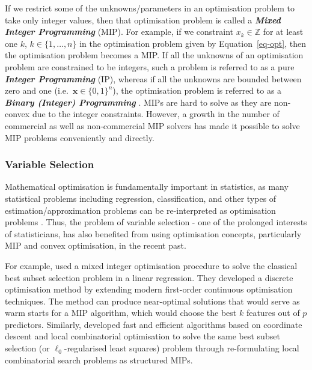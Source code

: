 \documentclass[11pt,a4paper,]{article}
\begin{document}
If we restrict some of the unknowns/parameters in an optimisation
problem to take only integer values, then that optimisation problem is
called a \textbf{\emph{Mixed Integer Programming}} (MIP). For example,
if we constraint \(x_{k} \in \mathbb{Z}\) for at least one \(k\),
\(k \in \{1, \dots, n\}\) in the optimisation problem given by
Equation~\ref{eq-opt}, then the optimisation problem becomes a MIP. If
all the unknowns of an optimisation problem are constrained to be
integers, such a problem is referred to as a pure \textbf{\emph{Integer
Programming}} (IP), whereas if all the unknowns are bounded between zero
and one (i.e.~\(\bm{x} \in \{ 0, 1 \}^{n}\)), the optimisation problem
is referred to as a \textbf{\emph{Binary (Integer) Programming}}
\autocite{Theusl2020}. MIPs are hard to solve as they are non-convex due
to the integer constraints. However, a growth in the number of
commercial as well as non-commercial MIP solvers has made it possible to
solve MIP problems conveniently and directly.

\hypertarget{variable-selection}{%
\subsubsection{Variable Selection}\label{variable-selection}}

Mathematical optimisation is fundamentally important in statistics, as
many statistical problems including regression, classification, and
other types of estimation/approximation problems can be re-interpreted
as optimisation problems \autocite{Theusl2020}. Thus, the problem of
variable selection - one of the prolonged interests of statisticians,
has also benefited from using optimisation concepts, particularly MIP
and convex optimisation, in the recent past.

For example, \textcite{Bertsimas2016} used a mixed integer optimisation
procedure to solve the classical best subset selection problem in a
linear regression. They developed a discrete optimisation method by
extending modern first-order continuous optimisation techniques. The
method can produce near-optimal solutions that would serve as warm
starts for a MIP algorithm, which would choose the best \(k\) features
out of \(p\) predictors. Similarly, \textcite{Hazimeh2020} developed
fast and efficient algorithms based on coordinate descent and local
combinatorial optimisation to solve the same best subset selection (or
\(\ell_{0}\)-regularised least squares) problem through re-formulating
local combinatorial search problems as structured MIPs.
\end{document}
